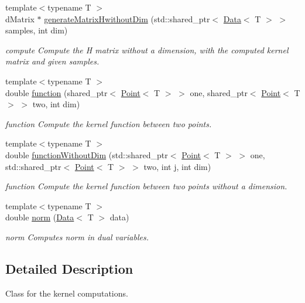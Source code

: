 \begin{DoxyCompactItemize}
{\footnotesize template$<$typename T $>$ }\\d\+Matrix $\ast$ \mbox{\hyperlink{class_kernel_a32f8639c734692862062817efaeead64}{generate\+Matrix\+Hwithout\+Dim}} (std\+::shared\+\_\+ptr$<$ \mbox{\hyperlink{class_data}{Data}}$<$ T $>$ $>$ samples, int dim)
\begin{DoxyCompactList}\small\item\em compute Compute the H matrix without a dimension, with the computed kernel matrix and given samples. \end{DoxyCompactList}\item 
{\footnotesize template$<$typename T $>$ }\\double \mbox{\hyperlink{class_kernel_a48ef2d6a0786b1a150f75af3f595c536}{function}} (shared\+\_\+ptr$<$ \mbox{\hyperlink{class_point}{Point}}$<$ T $>$ $>$ one, shared\+\_\+ptr$<$ \mbox{\hyperlink{class_point}{Point}}$<$ T $>$ $>$ two, int dim)
\begin{DoxyCompactList}\small\item\em function Compute the kernel function between two points. \end{DoxyCompactList}\item 
{\footnotesize template$<$typename T $>$ }\\double \mbox{\hyperlink{class_kernel_aae7563927691a73b6f20b0194087c035}{function\+Without\+Dim}} (std\+::shared\+\_\+ptr$<$ \mbox{\hyperlink{class_point}{Point}}$<$ T $>$ $>$ one, std\+::shared\+\_\+ptr$<$ \mbox{\hyperlink{class_point}{Point}}$<$ T $>$ $>$ two, int j, int dim)
\begin{DoxyCompactList}\small\item\em function Compute the kernel function between two points without a dimension. \end{DoxyCompactList}\item 
{\footnotesize template$<$typename T $>$ }\\double \mbox{\hyperlink{class_kernel_a686e3cd96a93d7742226dedd5beb9da7}{norm}} (\mbox{\hyperlink{class_data}{Data}}$<$ T $>$ data)
\begin{DoxyCompactList}\small\item\em norm Computes norm in dual variables. \end{DoxyCompactList}\end{DoxyCompactItemize}


\subsection{Detailed Description}
Class for the kernel computations. 

